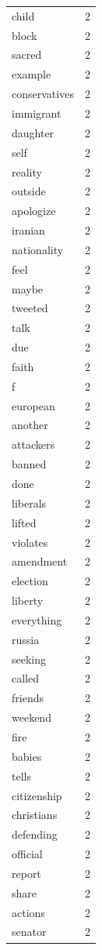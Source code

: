 \begin{tabular}{lr}
child & 2 \\
block & 2 \\
sacred & 2 \\
example & 2 \\
conservatives & 2 \\
immigrant & 2 \\
daughter & 2 \\
self & 2 \\
reality & 2 \\
outside & 2 \\
apologize & 2 \\
iranian & 2 \\
nationality & 2 \\
feel & 2 \\
maybe & 2 \\
tweeted & 2 \\
talk & 2 \\
due & 2 \\
faith & 2 \\
f & 2 \\
european & 2 \\
another & 2 \\
attackers & 2 \\
banned & 2 \\
done & 2 \\
liberals & 2 \\
lifted & 2 \\
violates & 2 \\
amendment & 2 \\
election & 2 \\
liberty & 2 \\
everything & 2 \\
russia & 2 \\
seeking & 2 \\
called & 2 \\
friends & 2 \\
weekend & 2 \\
fire & 2 \\
babies & 2 \\
tells & 2 \\
citizenship & 2 \\
christians & 2 \\
defending & 2 \\
official & 2 \\
report & 2 \\
share & 2 \\
actions & 2 \\
senator & 2 \\

\end{tabular}
